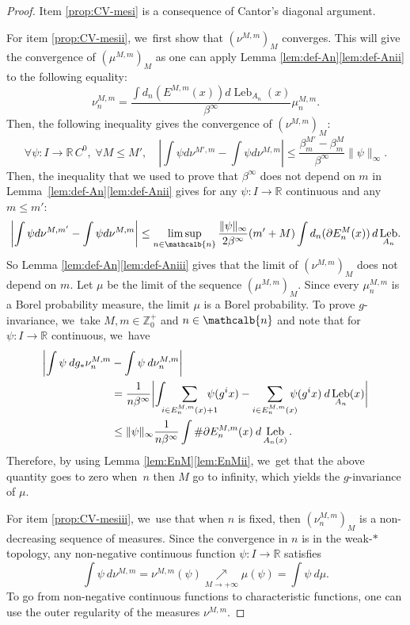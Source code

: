 \documentclass[10pt]{amsart}
\DeclareMathOperator{\Leb}{Leb}
\newcommand{\mcbn}{{\mathcalb{n}}}
\theoremstyle{definition}
\newcommand{\bbR}{{\mathbb{R}}}
\newcommand{\bbZ}{{\mathbb{Z}}}
\begin{document}
\begin{proof}
Item \eqref{prop:CV-mesi} is a consequence of Cantor's diagonal argument.

For item \eqref{prop:CV-mesii}, we~first show that $(\nu^{M,m})_M$ converges. This will give the convergence of $(\mu^{M,m})_M$ as one can apply Lemma \ref{lem:def-An}\eqref{lem:def-Anii} to the following equality:
\[
\nu_n^{M,m} = \frac{\int d_n(E^{M,m}(x)) d\Leb_{A_n}(x)}{\beta^{\infty}} \mu_n^{M,m}.
\]
Then, the following inequality gives the convergence of $(\nu^{M,m})_M$:
\[
\forall \psi : I \rightarrow \bbR \,C^0,\; \forall M \leq M',\quad
\left|\int \psi d \nu^{M',m} - \int \psi d \nu^{M,m}\right|
\leq \frac{\beta_m^{M'} - \beta_m^M}{\beta^{\infty}} \| \psi \|_{\infty}.
\]
Then, the inequality that we used to prove that $\beta^{\infty}$ does not depend on $m$ in Lem\-ma~\ref{lem:def-An}\eqref{lem:def-Anii} gives for any $\psi : I \to \bbR \text{ continuous}$ and any $m \leq m'$:
\[
\left | \int \psi d \nu^{M,m'} - \int \psi d \nu^{M,m} \right | \leq \limsup_{n \in \mcbn} \frac{\| \psi \|_{\infty}}{2 \beta^{\infty}} (m' + M) \int d_n(\partial E_n^M(x))\, d \Leb_{A_n}\!.
\]
So Lemma \ref{lem:def-An}\eqref{lem:def-Aniii} gives that the limit of $(\nu^{M,m})_M$ does not depend on $m$.
Let $\mu$ be the limit of the sequence $(\mu^{M,m})_M$. Since every $\mu_n^{M,m}$ is a Borel probability measure, the limit $\mu$ is a Borel probability. To prove $g$-invariance, we~take $M,m \in \bbZ_0^+$ and $n \in \mcbn$ and note that for $\psi : I \to \bbR$ continuous, we~have
\begin{align*}
\biggl | \int \psi \: d g_* \nu_n^{M,m} &- \int \psi \: d \nu_n^{M,m} \biggr |\\
&= \frac{1}{n \beta^{\infty} }\biggl | \int \hspace{-2mm} \sum_{i \in E_n^{M,m}(x)+1}\hspace{-4mm} \psi(g^i x) - \sum_{i \in E_n^{M,m}(x)} \hspace{-3mm}\psi(g^i x) \: d \Leb_{A_n}(x) \biggr |\\
&\leq \| \psi \|_{\infty} \frac{1}{n \beta^{\infty} } \int \# \partial E_n^{M,m}(x) \: d\Leb_{A_n(x)}.
\end{align*}
Therefore, by using Lemma \ref{lem:EnM}\eqref{lem:EnMii}, we~get that the above quantity goes to zero when~$n$ then $M$ go to infinity, which yields the $g$-invariance of $\mu$.

For item \eqref{prop:CV-mesiii}, we~use that when $n$ is fixed, then $(\nu_n^{M,m})_M$ is a non-decreasing sequence of measures. Since the convergence in $n$ is in the weak\nobreakdash-$*$ topology, any non-negative continuous function $\psi : I \to \bbR$ satisfies
\[
\int \psi \: d \nu^{M,m} =\nu^{M,m}(\psi) \!\underset{M \to +\infty}{\nearrow}\! \mu(\psi) = \int \psi \: d \mu.
\]
To go from non-negative continuous functions to characteristic functions, one can use the outer regularity of the measures $\nu^{M,m}$.
\end{proof}
\end{document}
